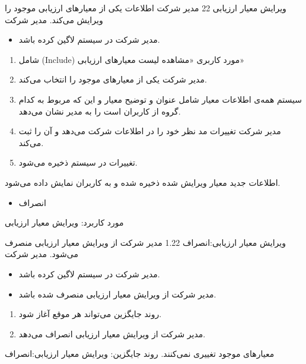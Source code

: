 \usecase
{
ویرایش معیار ارزیابی
}
{22}
{
مدیر شرکت اطلاعات یکی از معیارهای ارزیابی موجود را ویرایش می‌کند.
}
{
	مدیر شرکت
}
{}
{
	\begin{itemize}
	\vspace*{-0.6cm}
	\item 
	مدیر شرکت در سیستم لاگین کرده باشد.
\end{itemize}
}
{
	\vspace*{-0.6cm}
	\begin{enumerate}
		\item 
		شامل (Include) مورد کاربری «مشاهده لیست معیارهای ارزیابی»
		\item
		مدیر شرکت یکی از معیارهای موجود را انتخاب می‌کند.
		\item 
		سیستم همه‌ی اطلاعات معیار شامل عنوان و توضیح معیار و این که مربوط به کدام گروه از کاربران است را به مدیر نشان می‌دهد.
		\item 
		مدیر شرکت تغییرات مد نظر خود را در اطلاعات شرکت می‌دهد و آن را ثبت می‌کند.
		\item 
		تغییرات در سیستم ذخیره می‌شود.
	\end{enumerate}
}
{
اطلاعات جدید معیار ویرایش شده ذخیره شده و به کاربران نمایش داده می‌شود.
}
{
	\begin{itemize}
		\vspace*{-0.6cm}
		\item 
		انصراف
	\end{itemize}
}
{
	مورد کاربرد: ویرایش معیار ارزیابی
}




\alternativeflow
{
ویرایش معیار ارزیابی:انصراف
}
{1.22}
{
	مدیر شرکت از ویرایش معیار ارزیابی منصرف می‌شود.
}
{
	مدیر شرکت
}
{}
{
	\begin{itemize}
		\vspace*{-0.6cm}
		\item 
		مدیر شرکت در سیستم لاگین کرده باشد.
		\item
		مدیر شرکت از ویرایش معیار ارزیابی منصرف شده باشد.
	\end{itemize}
}
{
	\vspace*{-0.6cm}
	\begin{enumerate}
		\item 
		روند جایگزین می‌تواند هر موقع آغاز شود.
		\item
		مدیر شرکت از ویرایش معیار ارزیابی انصراف می‌دهد.
	\end{enumerate}
}
{
	معیارهای موجود تغییری نمی‌کنند.
}
{
	روند جایگزین: ویرایش معیار ارزیابی:انصراف
}

